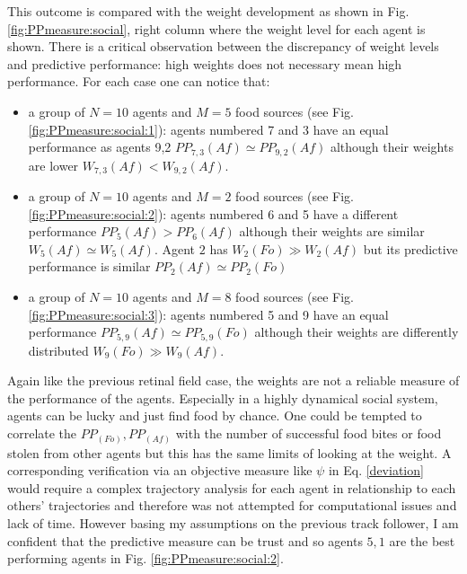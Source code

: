 This outcome is compared with the weight development as shown in Fig.\ref{fig:PPmeasure:social},
right column where the weight level for each agent is shown.
There is a critical observation between the discrepancy of weight levels and predictive performance:
high weights does not necessary mean high performance.
For each case one can notice that:
\begin{itemize}
 \item a group of $N=10$ agents and $M=5$ food sources (see Fig. \ref{fig:PPmeasure:social:1}): agents numbered 7 and 3 have
an equal performance as agents 9,2 $PP_{7,3}(Af)\simeq PP_{9,2}(Af)$ although their weights are
lower $W_{7,3}(Af) < W_{9,2}(Af)$.
 \item a group of $N=10$ agents and $M=2$ food sources (see Fig. \ref{fig:PPmeasure:social:2}): agents numbered 6 and 5 have
a different performance $PP_{5}(Af) > PP_{6}(Af)$ although their weights are
similar $W_{5}(Af) \simeq W_{5}(Af)$. Agent $2$ has $W_{2}(Fo) \gg W_{2}(Af)$ but
its predictive performance is similar  $PP_{2}(Af) \simeq PP_{2}(Fo)$
 \item a group of $N=10$ agents and $M=8$ food sources (see Fig. \ref{fig:PPmeasure:social:3}): agents numbered 5 and 9 have
an equal performance $PP_{5,9}(Af) \simeq PP_{5,9}(Fo)$ although their weights are
differently distributed $W_{9}(Fo) \gg W_{9}(Af)$.
\end{itemize}

Again like the previous retinal field case, the weights are not a reliable measure of
the performance of the agents.
Especially in a highly dynamical social system, agents can be lucky and just find
food by chance.
One could be tempted to correlate the $PP_(Fo),PP_(Af)$ with the number of 
successful food bites or food stolen from other agents but this has the same limits
of looking at the weight.
A corresponding verification via an objective measure like $\psi$ in Eq. \ref{deviation}
would require a complex trajectory analysis for each agent in relationship to each others'
trajectories and therefore was not attempted for computational issues and lack of time.
However basing my assumptions on the previous track follower, I am confident that
the predictive measure can be trust and so agents $5,1$ are the best performing
agents in Fig. \ref{fig:PPmeasure:social:2}. 

